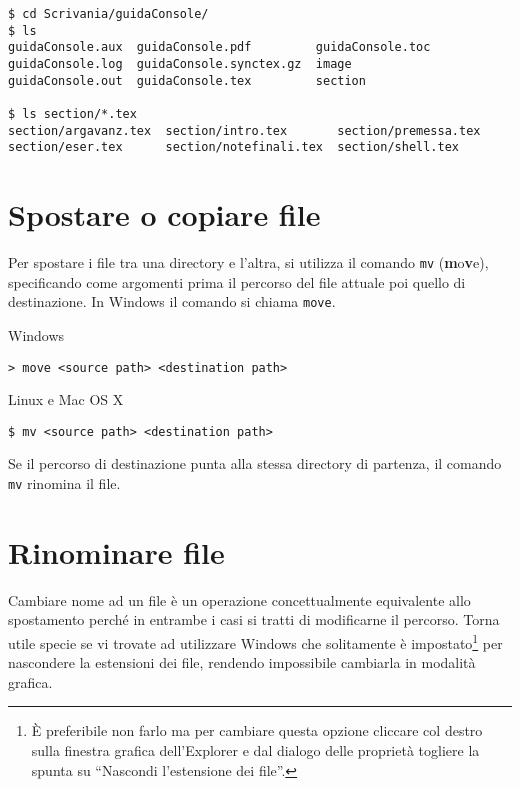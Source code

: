 \begin{Verbatim}[fontsize=\small]
$ cd Scrivania/guidaConsole/
$ ls
guidaConsole.aux  guidaConsole.pdf         guidaConsole.toc
guidaConsole.log  guidaConsole.synctex.gz  image
guidaConsole.out  guidaConsole.tex         section

$ ls section/*.tex
section/argavanz.tex  section/intro.tex       section/premessa.tex
section/eser.tex      section/notefinali.tex  section/shell.tex
\end{Verbatim}

\section{Spostare o copiare file}

Per spostare i file tra una directory e l'altra, si utilizza il comando \texttt{mv} (\textbf{m}o\textbf{v}e), specificando come argomenti prima il percorso del file attuale poi quello di destinazione. In Windows il comando si chiama \texttt{move}.
\smallskip
\begin{tcolorbox}
Windows
\tcblower
\begin{verbatim}
> move <source path> <destination path>
\end{verbatim}
\end{tcolorbox}

\begin{tcolorbox}
Linux e Mac OS X
\tcblower
\begin{verbatim}
$ mv <source path> <destination path>
\end{verbatim}
\end{tcolorbox}

Se il percorso di destinazione punta alla stessa directory di partenza, il comando \texttt{mv} rinomina il file.

\section{Rinominare file}

Cambiare nome ad un file è un operazione concettualmente equivalente allo spostamento perché in entrambe i casi si tratti di modificarne il percorso. Torna utile specie se vi trovate ad utilizzare Windows che solitamente è impostato\footnote{\`E preferibile non farlo ma per cambiare questa opzione cliccare col destro sulla finestra grafica dell'Explorer e dal dialogo delle proprietà togliere la spunta su ``Nascondi l'estensione dei file''.} per nascondere la estensioni dei file, rendendo impossibile cambiarla in modalità grafica.

